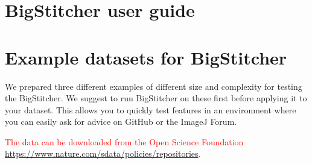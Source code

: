 \documentclass[]{spie}  %
\begin{document}


\section{BigStitcher user guide}
\label{sec:documentation}




\section{Example datasets for BigStitcher}
\label{sec:example}

We prepared three different examples of different size and complexity for testing the BigStitcher. We suggest to run BigStitcher on these first before applying it to your dataset. This allows you to quickly test features in an environment where you can easily ask for advice on GitHub or the ImageJ Forum.

\textcolor{red}{The data can be downloaded from the Open Science Foundation \url{https://www.nature.com/sdata/policies/repositories}.}
\end{document}
